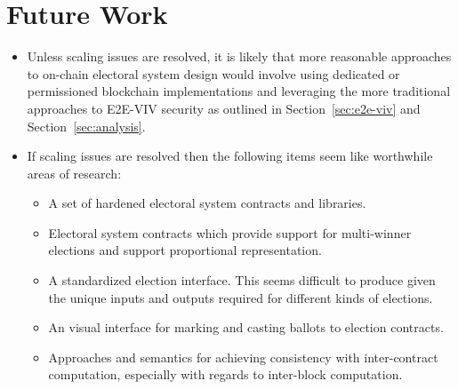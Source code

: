 \section*{Future Work}

\begin{itemize}
  \item Unless scaling issues are resolved, it is likely that more reasonable
    approaches to on-chain electoral system design would involve using dedicated
    or permissioned blockchain implementations and leveraging the more
    traditional approaches to E2E-VIV security as outlined in
    Section~\ref{sec:e2e-viv} and Section~\ref{sec:analysis}.

  \item If scaling issues are resolved then the following items seem like
    worthwhile areas of research:

    \begin{itemize}
      \item A set of hardened electoral system contracts and libraries.

      \item Electoral system contracts which provide support for multi-winner
        elections and support proportional representation.

      \item A standardized election interface. This seems difficult to produce
        given the unique inputs and outputs required for different kinds of
        elections.

      \item An visual interface for marking and casting ballots to election
        contracts.

      \item Approaches and semantics for achieving consistency with
        inter-contract computation, especially with regards to inter-block
        computation.
    \end{itemize}
\end{itemize}
